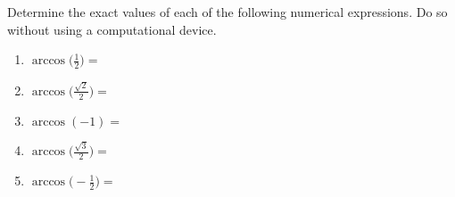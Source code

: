 \documentclass{ximera}
\author{Elizabeth Campolongo}
\begin{document}
\begin{exercise}

Determine the exact values of each of the following numerical expressions.  Do so without using a computational device.%

\begin{enumerate}
\item $\arccos\Big(\frac{1}{2}\Big) =$
\begin{multipleChoice}
	\choice{$\pi$}
\end{multipleChoice}
%
\item $\arccos\bigg(\frac{\sqrt{2}}{2}\bigg) =$ 
\begin{multipleChoice}
	\choice{$\pi$}
\end{multipleChoice}
%
\item $\arccos(-1) =$
\begin{multipleChoice}
	\choice[correct]{$\pi$}
\end{multipleChoice}
%
\item $\arccos\bigg(\frac{\sqrt{3}}{2}\bigg) =$ 
\begin{multipleChoice}
	\choice{$\pi$}
\end{multipleChoice}
%
\item $\arccos\Big(-\frac{1}{2}\Big) = $
\begin{multipleChoice}

\end{multipleChoice}
\end{enumerate}
\end{exercise}
\end{document}
